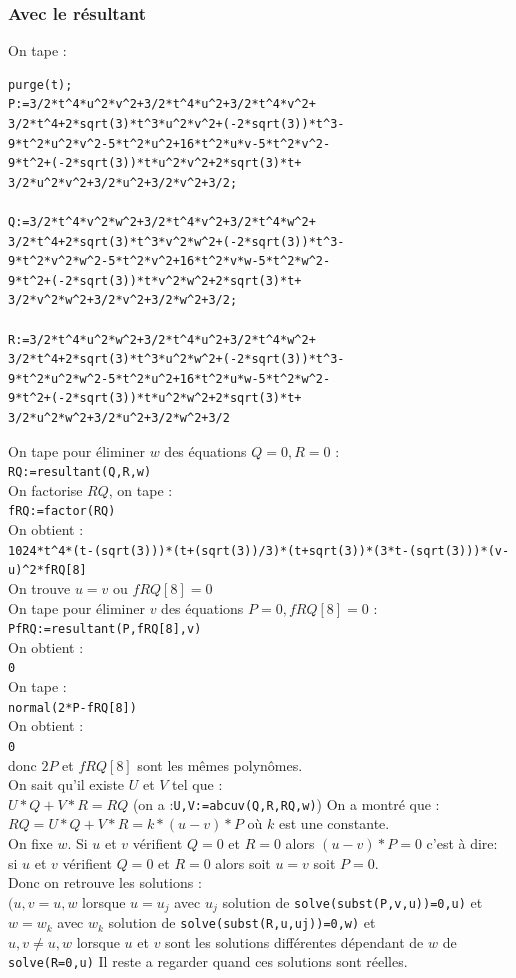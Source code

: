 \documentclass[a4paper,11pt]{book}
\begin{document}
\subsubsection{Avec le r\'esultant}
On tape :
\begin{verbatim}
purge(t);
P:=3/2*t^4*u^2*v^2+3/2*t^4*u^2+3/2*t^4*v^2+
3/2*t^4+2*sqrt(3)*t^3*u^2*v^2+(-2*sqrt(3))*t^3-
9*t^2*u^2*v^2-5*t^2*u^2+16*t^2*u*v-5*t^2*v^2-
9*t^2+(-2*sqrt(3))*t*u^2*v^2+2*sqrt(3)*t+
3/2*u^2*v^2+3/2*u^2+3/2*v^2+3/2;

Q:=3/2*t^4*v^2*w^2+3/2*t^4*v^2+3/2*t^4*w^2+
3/2*t^4+2*sqrt(3)*t^3*v^2*w^2+(-2*sqrt(3))*t^3-
9*t^2*v^2*w^2-5*t^2*v^2+16*t^2*v*w-5*t^2*w^2-
9*t^2+(-2*sqrt(3))*t*v^2*w^2+2*sqrt(3)*t+
3/2*v^2*w^2+3/2*v^2+3/2*w^2+3/2;

R:=3/2*t^4*u^2*w^2+3/2*t^4*u^2+3/2*t^4*w^2+
3/2*t^4+2*sqrt(3)*t^3*u^2*w^2+(-2*sqrt(3))*t^3-
9*t^2*u^2*w^2-5*t^2*u^2+16*t^2*u*w-5*t^2*w^2-
9*t^2+(-2*sqrt(3))*t*u^2*w^2+2*sqrt(3)*t+
3/2*u^2*w^2+3/2*u^2+3/2*w^2+3/2
\end{verbatim}
On tape pour \'eliminer $w$ des \'equations $Q=0,R=0$ :\\
{\tt RQ:=resultant(Q,R,w)}\\
On factorise $RQ$, on tape :\\
{\tt fRQ:=factor(RQ)}\\
On obtient :\\
{\tt 1024*t\verb|^|4*(t-(sqrt(3)))*(t+(sqrt(3))/3)*(t+sqrt(3))*(3*t-(sqrt(3)))*(v-u)\verb|^|2*fRQ[8]}\\
On trouve $u=v$ ou  $fRQ[8]=0$\\
On tape pour \'eliminer $v$ des \'equations $P=0,fRQ[8]=0$ :\\
{\tt PfRQ:=resultant(P,fRQ[8],v)}\\
On obtient :\\
{\tt 0}\\
On tape :\\
{\tt normal(2*P-fRQ[8])}\\
On obtient :\\
{\tt 0}\\
donc $2P$ et $fRQ[8]$ sont les m\^emes polyn\^omes.\\
On sait qu'il existe $U$ et $V$ tel que :\\
$U*Q+V*R=RQ$ (on a :{\tt U,V:=abcuv(Q,R,RQ,w)})
On a montr\'e que :\\
$RQ=U*Q+V*R=k*(u-v)*P$ o\`u $k$ est une constante.\\
On fixe $w$. 
Si $u$ et $v$ v\'erifient $Q=0$ et $R=0$ alors $(u-v)*P=0$ c'est \`a dire:\\
si $u$ et $v$ v\'erifient $Q=0$ et $R=0$ alors soit $u=v$ soit $P=0$.\\
Donc on retrouve les solutions :\\
$(u,v=u,w$ lorsque $u=u_j$ avec $u_j$ solution de {\tt solve(subst(P,v,u))=0,u)}
et $w=w_k$ avec $w_k$ solution de {\tt solve(subst(R,u,uj))=0,w)} et\\
$u,v\neq u,w$ lorsque $u$ et $v$ sont les solutions diff\'erentes d\'ependant 
de $w$ de {\tt solve(R=0,u)}
Il reste a regarder quand ces solutions sont r\'eelles.
\end{document}
